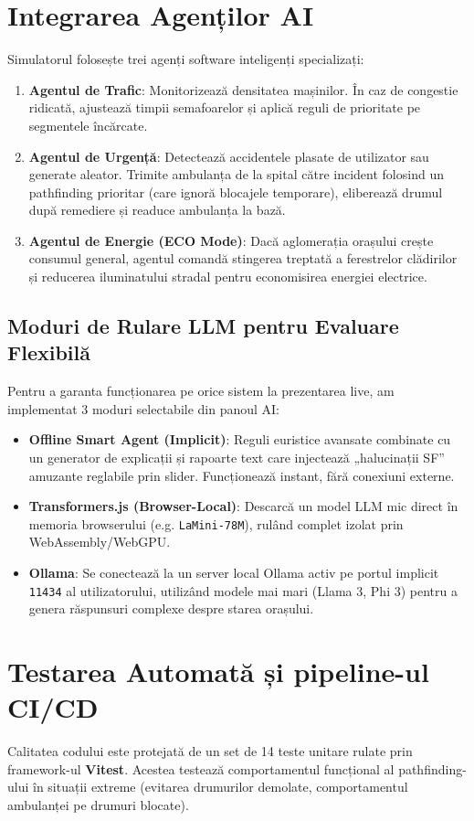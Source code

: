 \documentclass[12pt,a4paper]{article}
\begin{document}
\section{Integrarea Agenților AI}
Simulatorul folosește trei agenți software inteligenți specializați:
\begin{enumerate}
    \item \textbf{Agentul de Trafic}: Monitorizează densitatea mașinilor. În caz de congestie ridicată, ajustează timpii semafoarelor și aplică reguli de prioritate pe segmentele încărcate.
    \item \textbf{Agentul de Urgență}: Detectează accidentele plasate de utilizator sau generate aleator. Trimite ambulanța de la spital către incident folosind un pathfinding prioritar (care ignoră blocajele temporare), eliberează drumul după remediere și readuce ambulanța la bază.
    \item \textbf{Agentul de Energie (ECO Mode)}: Dacă aglomerația orașului crește consumul general, agentul comandă stingerea treptată a ferestrelor clădirilor și reducerea iluminatului stradal pentru economisirea energiei electrice.
\end{enumerate}

\subsection{Moduri de Rulare LLM pentru Evaluare Flexibilă}
Pentru a garanta funcționarea pe orice sistem la prezentarea live, am implementat 3 moduri selectabile din panoul AI:
\begin{itemize}
    \item \textbf{Offline Smart Agent (Implicit)}: Reguli euristice avansate combinate cu un generator de explicații și rapoarte text care injectează „halucinații SF” amuzante reglabile prin slider. Funcționează instant, fără conexiuni externe.
    \item \textbf{Transformers.js (Browser-Local)}: Descarcă un model LLM mic direct în memoria browserului (e.g. \texttt{LaMini-78M}), rulând complet izolat prin WebAssembly/WebGPU.
    \item \textbf{Ollama}: Se conectează la un server local Ollama activ pe portul implicit \texttt{11434} al utilizatorului, utilizând modele mai mari (Llama 3, Phi 3) pentru a genera răspunsuri complexe despre starea orașului.
\end{itemize}

\section{Testarea Automată și pipeline-ul CI/CD}
Calitatea codului este protejată de un set de 14 teste unitare rulate prin framework-ul \textbf{Vitest}. Acestea testează comportamentul funcțional al pathfinding-ului în situații extreme (evitarea drumurilor demolate, comportamentul ambulanței pe drumuri blocate).
\end{document}
